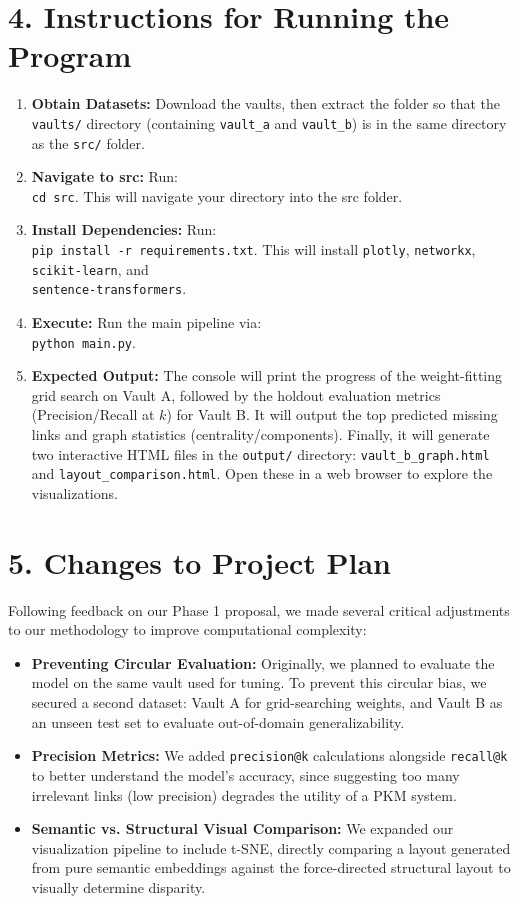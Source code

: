 \documentclass[fontsize=11pt]{article}
\begin{document}
\section*{4. Instructions for Running the Program}

\begin{enumerate}
    \item \textbf{Obtain Datasets:} Download the vaults, then extract the folder so that the \texttt{vaults/} directory (containing \texttt{vault\_a} and \texttt{vault\_b}) is in the same directory as the \texttt{src/} folder.
    \item \textbf{Navigate to src:} Run: \\ \texttt{cd src}. This will navigate your directory into the src folder.
    \item \textbf{Install Dependencies:} Run: \\ \texttt{pip install -r requirements.txt}. This will install \texttt{plotly}, \texttt{networkx}, \texttt{scikit-learn}, and\\ \texttt{sentence-transformers}.
    \item \textbf{Execute:} Run the main pipeline via: \\ \texttt{python main.py}.
    \item \textbf{Expected Output:} The console will print the progress of the weight-fitting grid search on Vault A, followed by the holdout evaluation metrics (Precision/Recall at $k$) for Vault B. It will output the top predicted missing links and graph statistics (centrality/components). Finally, it will generate two interactive HTML files in the \texttt{output/} directory: \texttt{vault\_b\_graph.html} and \texttt{layout\_comparison.html}. Open these in a web browser to explore the visualizations.
\end{enumerate}

\section*{5. Changes to Project Plan}

Following feedback on our Phase 1 proposal, we made several critical adjustments to our methodology to improve computational complexity:
\begin{itemize}
    \item \textbf{Preventing Circular Evaluation:} Originally, we planned to evaluate the model on the same vault used for tuning. To prevent this circular bias, we secured a second dataset: Vault A for grid-searching weights, and Vault B as an unseen test set to evaluate out-of-domain generalizability.
    \item \textbf{Precision Metrics:} We added \texttt{precision@k} calculations alongside \texttt{recall@k} to better understand the model's accuracy, since suggesting too many irrelevant links (low precision) degrades the utility of a PKM system.
    \item \textbf{Semantic vs. Structural Visual Comparison:} We expanded our visualization pipeline to include t-SNE, directly comparing a layout generated from pure semantic embeddings against the force-directed structural layout to visually determine disparity.
\end{itemize}
\end{document}

